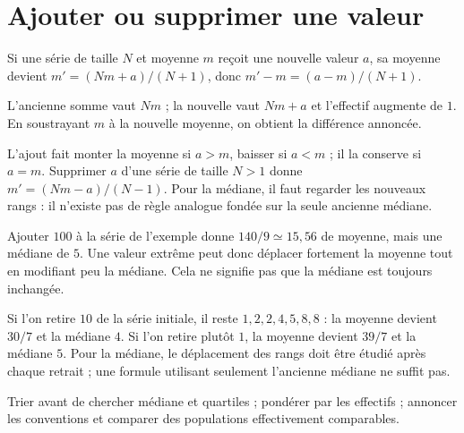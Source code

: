 \documentclass[../cours_2de.tex]{subfiles}
\begin{document}
\section{Ajouter ou supprimer une valeur}
\begin{propriete}
Si une série de taille $N$ et moyenne $m$ reçoit une nouvelle valeur $a$, sa moyenne devient
$m'=(Nm+a)/(N+1)$, donc $m'-m=(a-m)/(N+1)$.
\end{propriete}
\begin{demonstration}
L'ancienne somme vaut $Nm$ ; la nouvelle vaut $Nm+a$ et l'effectif augmente de $1$. En soustrayant $m$ à la nouvelle moyenne, on obtient la différence annoncée.
\end{demonstration}
L'ajout fait monter la moyenne si $a>m$, baisser si $a<m$ ; il la conserve si $a=m$.
Supprimer $a$ d'une série de taille $N>1$ donne $m'=(Nm-a)/(N-1)$.
Pour la médiane, il faut regarder les nouveaux rangs : il n'existe pas de règle analogue fondée sur la seule ancienne médiane.
\begin{exemple}
Ajouter $100$ à la série de l'exemple donne $140/9\simeq15{,}56$ de moyenne, mais une médiane de $5$.
Une valeur extrême peut donc déplacer fortement la moyenne tout en modifiant peu la médiane. Cela ne signifie pas que la médiane est toujours inchangée.
\end{exemple}
\begin{exemple}
Si l'on retire $10$ de la série initiale, il reste $1,2,2,4,5,8,8$ : la moyenne devient $30/7$ et la médiane $4$. Si l'on retire plutôt $1$, la moyenne devient $39/7$ et la médiane $5$. Pour la médiane, le déplacement des rangs doit être étudié après chaque retrait ; une formule utilisant seulement l'ancienne médiane ne suffit pas.
\end{exemple}
\begin{retenir}
Trier avant de chercher médiane et quartiles ; pondérer par les effectifs ; annoncer les conventions et comparer des populations effectivement comparables.
\end{retenir}
\end{document}

